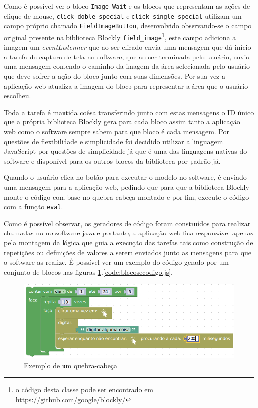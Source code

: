 \documentclass[tg]{mdtufsm}
\begin{document}
                Como é possível ver o bloco \texttt{Image\_Wait} e os blocos que representam as ações de clique de mouse, \texttt{click\_doble\_special} e \texttt{click\_single\_special} utilizam um campo próprio chamado \texttt{FieldImageButton}, desenvolvido observando-se o campo original presente na biblioteca Blockly \texttt{field\_image}\footnote{o código desta classe pode ser encontrado em https://github.com/google/blockly/}, este campo adiciona a imagem um \emph{eventListenner} que ao ser clicado envia uma mensagem que dá início a tarefa de captura de tela no software, que ao ser terminada pelo usuário, envia uma mensagem contendo o caminho da imagem da área selecionada pelo usuário que deve sofrer a ação do bloco junto com suas dimensões. Por sua vez a aplicação web atualiza a imagem do bloco para representar a área que o usuário escolheu.

                Toda a tarefa é mantida coêsa transferindo junto com estas mensagens o ID único que a própria biblioteca Blockly gera para cada bloco assim tanto a aplicação web como o software sempre sabem para que bloco é cada mensagem. Por questões de flexibilidade e simplicidade foi decidido utilizar a linguagem JavaScript por questões de simplicidade já que é uma das linguagens nativas do software e disponível para os outros blocos da biblioteca por padrão já.

                Quando o usuário clica no botão para executar o modelo no software, é enviado uma mensagem para a aplicação web, pedindo que para que a biblioteca Blockly monte o código com base no quebra-cabeça montado e por fim, execute o código com a função \texttt{eval}.

                Como é possível observar, os geradores de código foram construídos para realizar chamadas no no software java e portanto, a aplicação web fica responsável apenas pela montagem da lógica que guia a execução das tarefas tais como construção de repetições ou definições de valores a serem enviados junto as mensagens para que o software as realize. É possível ver um exemplo do código gerado por um conjunto de blocos nas figuras \ref{fig:blocosecodigo}.\ref{code:blocosecodigo.js}.

                \begin{figure}[!htb]
                    {\centering
                    \includegraphics[width=1.0\textwidth]{imagens/blocosecodigo.png}
                    \caption{Exemplo de um quebra-cabeça}
                    \label{fig:blocosecodigo}}
                \end{figure}
\end{document}
